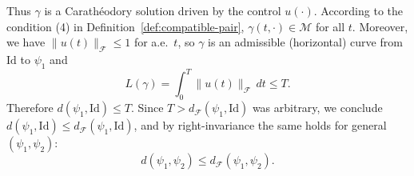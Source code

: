 \documentclass[12pt]{amsart}
\numberwithin{equation}{section}
\theoremstyle{remark}
\begin{document}
Thus $\gamma$ is a Carath\'eodory solution driven by the control $u(\cdot)$. According to the condition \textup{(4)} in Definition~\ref{def:compatible-pair}, $\gamma(t,\cdot)\in\mathcal M$ for all $t$.
Moreover, we have $\|u(t)\|_{\mathcal F}\le 1$ for a.e.\ $t$,
so $\gamma$ is an admissible (horizontal) curve from $\mathrm{Id}$ to $\psi_1$ and
\begin{equation}
L(\gamma)=\int_0^T \|u(t)\|_{\mathcal F}\,dt \le T.
\end{equation}
Therefore $d(\psi_1,\mathrm{Id})\le T$.
Since $T>d_{\mathcal F}(\psi_1,\mathrm{Id})$ was arbitrary, we conclude
$d(\psi_1,\mathrm{Id})\le d_{\mathcal F}(\psi_1,\mathrm{Id})$, and by right-invariance
the same holds for general $(\psi_1,\psi_2)$:
\begin{equation}
d(\psi_1,\psi_2)\le d_{\mathcal F}(\psi_1,\psi_2).
\end{equation}





















\end{document}
